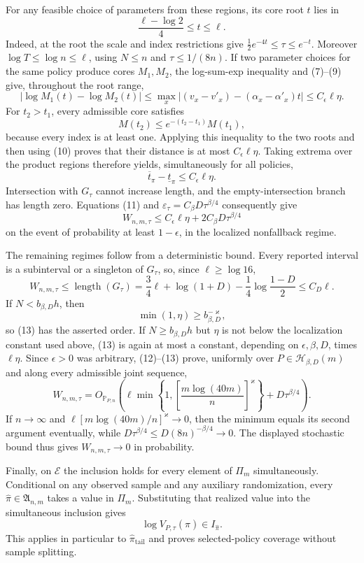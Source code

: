 For any feasible choice of parameters from these regions, its core root \(t\) lies in
\[
 \frac{\ell-\log2}{4}\leq t\leq\ell.
 \tag{9}
\]
Indeed, at the root the scale and index restrictions give
\(\tfrac12e^{-4t}\leq\tau\leq e^{-t}\).  Moreover
\(\log T\leq\log n\leq\ell\), using \(N\leq n\) and \(\tau\leq1/(8n)\).  If two parameter choices for the same policy produce cores \(M_1,M_2\), the log-sum-exp inequality and (7)--(9) give, throughout the root range,
\[
 |\log M_1(t)-\log M_2(t)|
 \leq\max_x\left|(v_x-v'_x)-(\alpha_x-\alpha'_x)t\right|
 \leq C_\epsilon\ell\eta.
 \tag{10}
\]
For \(t_2>t_1\), every admissible core satisfies
\[
 M(t_2)\leq e^{-(t_2-t_1)}M(t_1),
\]
because every index is at least one.  Applying this inequality to the two roots and then using (10) proves that their distance is at most \(C_\epsilon\ell\eta\).  Taking extrema over the product regions therefore yields, simultaneously for all policies,
\[
 \overline t_\pi-\underline t_\pi\leq C_\epsilon\ell\eta.
 \tag{11}
\]
Intersection with \(G_\tau\) cannot increase length, and the empty-intersection branch has length zero.  Equations (11) and \(\varepsilon_\tau=C_\beta D\tau^{\beta/4}\) consequently give
\[
 W_{n,m,\tau}
 \leq C_\epsilon\ell\eta+2C_\beta D\tau^{\beta/4}
 \tag{12}
\]
on the event of probability at least \(1-\epsilon\), in the localized nonfallback regime.

The remaining regimes follow from a deterministic bound.  Every reported interval is a subinterval or a singleton of \(G_\tau\), so, since \(\ell\geq\log16\),
\[
 W_{n,m,\tau}\leq\operatorname{length}(G_\tau)
 =\frac34\ell+\log(1+D)-\frac14\log\frac{1-D}{2}
 \leq C_D\ell.
 \tag{13}
\]
If \(N<b_{\beta,D}h\), then
\[
 \min(1,\eta)\geq b_{\beta,D}^{-\varkappa},
\]
so (13) has the asserted order.  If \(N\geq b_{\beta,D}h\) but \(\eta\) is not below the localization constant used above, (13) is again at most a constant, depending on \(\epsilon,\beta,D\), times \(\ell\eta\).  Since \(\epsilon>0\) was arbitrary, (12)--(13) prove, uniformly over \(P\in\mathcal H_{\beta,D}(m)\) and along every admissible joint sequence,
\[
 W_{n,m,\tau}
 =O_{\mathbb P_{P,n}}\!\left(
 \ell\min\left\{1,\left[\frac{m\log(40m)}n\right]^{\varkappa}\right\}
 +D\tau^{\beta/4}\right).
\]
If \(n\to\infty\) and \(\ell[m\log(40m)/n]^{\varkappa}\to0\), then the minimum equals its second argument eventually, while \(D\tau^{\beta/4}\leq D(8n)^{-\beta/4}\to0\).  The displayed stochastic bound thus gives \(W_{n,m,\tau}\to0\) in probability.

Finally, on \(\mathcal E\) the inclusion holds for every element of \(\Pi_m\) simultaneously.  Conditional on any observed sample and any auxiliary randomization, every \(\widehat\pi\in\mathfrak A_{n,m}\) takes a value in \(\Pi_m\).  Substituting that realized value into the simultaneous inclusion gives
\[
 \log V_{P,\tau}(\widehat\pi)\in I_{\widehat\pi}.
\]
This applies in particular to \(\widehat\pi_{\mathrm{tail}}\) and proves selected-policy coverage without sample splitting.
